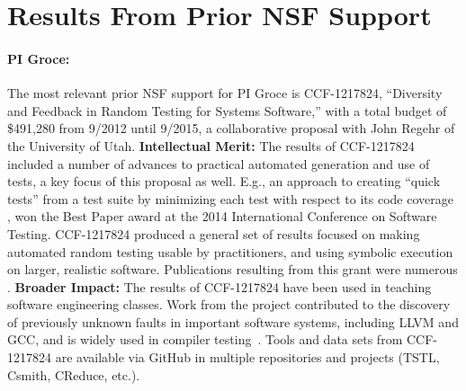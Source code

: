 \section{Results From Prior NSF Support}

\paragraph{PI Groce:}
The most relevant prior NSF support for PI Groce is
CCF-1217824, ``Diversity and Feedback in Random Testing for Systems
Software,'' with a total budget of \$491,280 from 9/2012 until 9/2015,
a collaborative proposal with John Regehr of the University of
Utah. {\bf Intellectual Merit:} The results of CCF-1217824 included a
number of advances to practical automated generation and use of tests,
a key focus of this proposal as well.  E.g., an approach to creating ``quick
tests'' from a test suite by minimizing each
test with respect to its code coverage \cite{icst2014}, won the
Best Paper award at the 2014 International Conference on Software
Testing.  CCF-1217824
produced a general set of results focused on making automated random
testing usable by practitioners, and using symbolic execution on
larger, realistic software.  Publications resulting from this grant
were numerous
\cite{Onward14,PLDI13,issta14,icst2014,helphelp,DirectedSwarm,stvrcausereduce,tstlsttt,ISSTA15,ASEAdeq}. {\bf
  Broader
  Impact:} The results of CCF-1217824 have been used in teaching software
engineering classes.
Work from the project contributed to the discovery of previously
unknown faults in important software
systems, including LLVM and GCC, and is widely used in compiler
testing~\cite{ZhendongPLDI14,beginnerluck,dewey2015fuzzing,le2015randomized}.
Tools and data sets from CCF-1217824 are available via GitHub in
multiple repositories and projects (TSTL, Csmith, CReduce, etc.).

